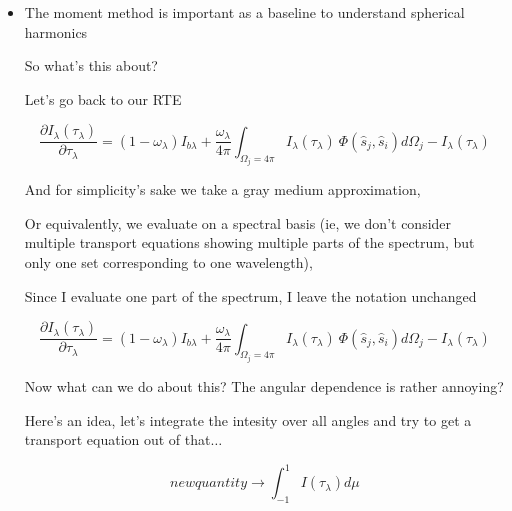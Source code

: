 \documentclass[12pt]{article}
\renewcommand{\_}{\kern-1.5pt\textunderscore\kern-1.5pt}
\begin{document}
\begin{itemize}
	\item The moment method is important as a baseline to understand spherical harmonics\par

So what’s this about?\par

Let’s go back to our RTE\par

 \[ \frac{ \partial I_{ \lambda } \left(  \tau_{ \lambda } \right) }{ \partial  \tau_{ \lambda }}= \left( 1- \omega _{ \lambda } \right)  I_{b \lambda }+\frac{ \omega _{ \lambda }}{4 \pi } \int _{ \Omega _{j}=4 \pi }^{}I_{ \lambda } \left(  \tau_{ \lambda } \right) ~ \Phi  \left( \hat{s}_{j},\hat{s}_{i} \right) d \Omega _{j}-I_{ \lambda } \left(  \tau_{ \lambda } \right)  \] \par

And for simplicity’s sake we take a gray medium approximation,\par

Or equivalently, we evaluate on a spectral basis (ie, we don’t consider multiple transport equations showing multiple parts of the spectrum, but only one set corresponding to one wavelength), \par

Since I evaluate one part of the spectrum, I leave the notation unchanged \par


\vspace{\baselineskip}
 \[ \frac{ \partial I_{ \lambda } \left(  \tau_{ \lambda } \right) }{ \partial  \tau_{ \lambda }}= \left( 1- \omega _{ \lambda } \right)  I_{b \lambda }+\frac{ \omega _{ \lambda }}{4 \pi } \int _{ \Omega _{j}=4 \pi }^{}I_{ \lambda } \left(  \tau_{ \lambda } \right) ~ \Phi  \left( \hat{s}_{j},\hat{s}_{i} \right) d \Omega _{j}-I_{ \lambda } \left(  \tau_{ \lambda } \right)  \] \par

Now what can we do about this? The angular dependence is rather annoying?\par


\vspace{\baselineskip}
Here’s an idea, let’s integrate the intesity over all angles and try to get a transport equation out of that$ \ldots $ \par

 \[ new quantity \rightarrow  \int _{-1}^{1}I \left(  \tau_{ \lambda } \right)  d \mu  \] \par


\end{itemize}
\end{document}
